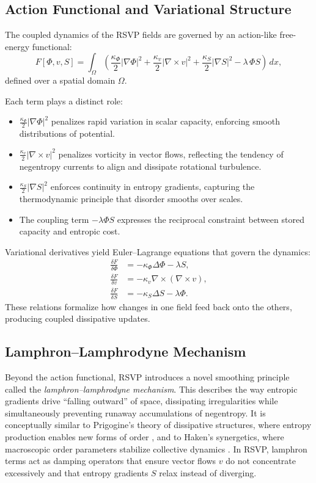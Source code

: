 \documentclass[12pt]{article}
\begin{document}
\subsection{Action Functional and Variational Structure}
The coupled dynamics of the RSVP fields are governed by an action-like free-energy functional:
\begin{equation}
F[\Phi,v,S] = \int_\Omega \left(
\frac{\kappa_\Phi}{2}|\nabla\Phi|^2
+\frac{\kappa_v}{2}|\nabla\times v|^2
+\frac{\kappa_S}{2}|\nabla S|^2
-\lambda \,\Phi S \right)\,dx ,
\end{equation}
defined over a spatial domain $\Omega$.  

Each term plays a distinct role:
\begin{itemize}
    \item $\frac{\kappa_\Phi}{2}|\nabla \Phi|^2$ penalizes rapid variation in scalar capacity, enforcing smooth distributions of potential.
    \item $\frac{\kappa_v}{2}|\nabla \times v|^2$ penalizes vorticity in vector flows, reflecting the tendency of negentropy currents to align and dissipate rotational turbulence.
    \item $\frac{\kappa_S}{2}|\nabla S|^2$ enforces continuity in entropy gradients, capturing the thermodynamic principle that disorder smooths over scales.
    \item The coupling term $-\lambda \Phi S$ expresses the reciprocal constraint between stored capacity and entropic cost.
\end{itemize}

Variational derivatives yield Euler–Lagrange equations that govern the dynamics:
\begin{align}
\frac{\delta F}{\delta \Phi} &= -\kappa_\Phi \Delta \Phi - \lambda S , \\
\frac{\delta F}{\delta v} &= -\kappa_v \nabla\times(\nabla\times v) , \\
\frac{\delta F}{\delta S} &= -\kappa_S \Delta S - \lambda \Phi .
\end{align}
These relations formalize how changes in one field feed back onto the others, producing coupled dissipative updates.

\subsection{Lamphron–Lamphrodyne Mechanism}
\label{sec:lamphron}

Beyond the action functional, RSVP introduces a novel smoothing principle called the \emph{lamphron–lamphrodyne mechanism}. This describes the way entropic gradients drive “falling outward” of space, dissipating irregularities while simultaneously preventing runaway accumulations of negentropy. It is conceptually similar to Prigogine’s theory of dissipative structures, where entropy production enables new forms of order \cite{Prigogine1980}, and to Haken’s synergetics, where macroscopic order parameters stabilize collective dynamics \cite{Haken1983}. In RSVP, lamphron terms act as damping operators that ensure vector flows $v$ do not concentrate excessively and that entropy gradients $S$ relax instead of diverging.
\end{document}
